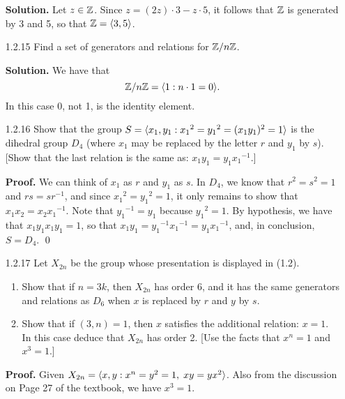 \begin{enumerate}
      \textbf{Solution.} Let $z \in \mathbb{Z}$. Since $z = (2z) \cdot 3 - z \cdot 5$,
      it follows that $\mathbb{Z}$ is generated by 3 and 5, so that $\mathbb{Z} = \langle 3, 5 \rangle$.
   \item[1.2.15]  Find a set of generators and relations for $\mathbb{Z}/n\mathbb{Z}$.
   
      \textbf{Solution.} We have that
      $$\mathbb{Z}/n\mathbb{Z} = \langle 1 : n \cdot 1 = 0 \rangle.$$
      In this case 0, not 1, is the identity element.
   \item[1.2.16]  Show that the group $S =
                  \langle x_1, y_1 : {x_1}^2 = {y_1}^2 = (x_1y_1)^2 = 1 \rangle$ is the
                  dihedral group $D_4$ (where $x_1$ may be replaced by the
                  letter $r$ and $y_1$ by $s$). [Show that the last relation is
                  the same as: $x_1y_1 = y_1{x_1}^{-1}$.]

      \textbf{Proof.} We can think of $x_1$ as $r$ and $y_1$ as $s$. In $D_4$,
      we know that $r^2 = s^2 = 1$ and $rs = sr^{-1}$, and since
      ${x_1}^2 = {y_1}^2 = 1$, it only remains to show that
      $x_1x_2 = x_2{x_1}^{-1}$. Note that ${y_1}^{-1} = y_1$ because
      ${y_1}^2 = 1$. By hypothesis, we have that $x_1y_1x_1y_1 = 1$,
      so that $x_1y_1 = {y_1}^{-1}{x_1}^{-1} = y_1{x_1}^{-1}$, and, in 
      conclusion, $S = D_4$. \qed
   \item[1.2.17]  Let $X_{2n}$ be the group whose presentation
                                  is displayed in (1.2).
                  \begin{enumerate}
                     \item Show that if $n = 3k$, then $X_{2n}$ has order 6, and
                           it has the same generators and relations as $D_6$
                           when $x$ is replaced by $r$ and $y$ by $s$.
                     \item Show that if $(3, n) = 1$, then $x$ satisfies the
                           additional relation: $x = 1$. In this case deduce
                           that $X_{2n}$ has order 2. [Use the facts that
                           $x^n = 1$ and $x^3 = 1$.]
                  \end{enumerate}

      \textbf{Proof.} Given $X_{2n} = \langle x, y :  x^n = y^2 = 1, \;xy = yx^2 \rangle$.
      Also from the discussion on Page 27 of the textbook, we have $x^3 = 1$.


\end{enumerate}
